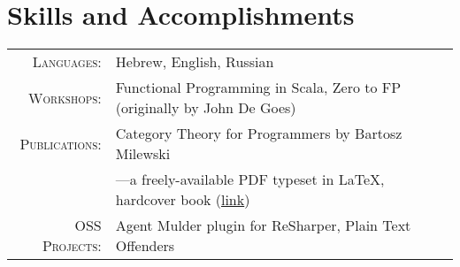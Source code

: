 \documentclass[a4paper,11pt]{article}
\begin{document}
\section{Skills and Accomplishments}
\begin{tabular}{rl}
    \textsc{Languages:}& Hebrew, English, Russian\\
    \textsc{Workshops:}& Functional Programming in Scala, Zero to FP (originally by John De Goes)\\
    \textsc{Publications:}& Category Theory for Programmers by Bartosz Milewski\\&---a freely-available PDF typeset in \LaTeX{}, hardcover book (\href{https://github.com/hmemcpy/milewski-ctfp-pdf}{link})\\
    \textsc{OSS Projects:}& Agent Mulder plugin for ReSharper, Plain Text Offenders\\
\end{tabular}
\end{document}
